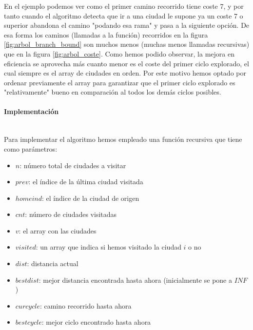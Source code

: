\documentclass{article}
\newcommand{\myparagraph}[1]{\paragraph{#1}\mbox{}\\}
\begin{document}
En el ejemplo podemos ver como el primer camino recorrido tiene coste 7, y por tanto cuando el algoritmo detecta que ir a una ciudad le supone ya un coste 7 o superior abandona el camino "podando esa rama" y pasa a la siguiente opción. De esa forma los caminos (llamadas a la función) recorridos en la figura \ref{fig:arbol_branch_bound} son muchos menos (muchas menos llamadas recursivas) que en la figura \ref{fig:arbol_coste}.
\newline
Como hemos podido observar, la mejora en eficiencia se aprovecha más cuanto menor es el coste del primer ciclo explorado, el cual siempre es el array de ciudades en orden. Por este motivo hemos optado por ordenar previamente el array para garantizar que el primer ciclo explorado es "relativamente" bueno en comparación al todos los demás ciclos posibles.
\myparagraph{Implementación}
Para implementar el algoritmo hemos empleado una función recursiva que tiene como parámetros:
\begin{itemize}
    \item $n$: número total de ciudades a visitar
    \item $prev$: el índice de la última ciudad visitada
    \item $homeind$: el índice de la ciudad de origen
    \item $cnt$: número de ciudades visitadas
    \item $v$: el array con las ciudades
    \item $visited$: un array que indica si hemos visitado la ciudad $i$ o no
    \item $dist$: distancia actual
    \item $bestdist$: mejor distancia encontrada hasta ahora (inicialmente se pone a $INF$)
    \item $curcycle$: camino recorrido hasta ahora
    \item $bestcycle$: mejor ciclo encontrado hasta ahora
\end{itemize}


\end{document}
